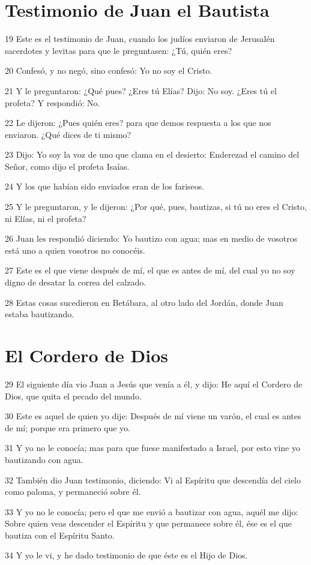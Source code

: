 \section*{Testimonio de Juan el Bautista}

\par 19 Este es el testimonio de Juan, cuando los judíos enviaron de Jerusalén sacerdotes y levitas para que le preguntasen: ¿Tú, quién eres?
\par 20 Confesó, y no negó, sino confesó: Yo no soy el Cristo.
\par 21 Y le preguntaron: ¿Qué pues? ¿Eres tú Elías? Dijo: No soy. ¿Eres tú el profeta? Y respondió: No.
\par 22 Le dijeron: ¿Pues quién eres? para que demos respuesta a los que nos enviaron. ¿Qué dices de ti mismo?
\par 23 Dijo: Yo soy la voz de uno que clama en el desierto: Enderezad el camino del Señor, como dijo el profeta Isaías.
\par 24 Y los que habían sido enviados eran de los fariseos.
\par 25 Y le preguntaron, y le dijeron: ¿Por qué, pues, bautizas, si tú no eres el Cristo, ni Elías, ni el profeta?
\par 26 Juan les respondió diciendo: Yo bautizo con agua; mas en medio de vosotros está uno a quien vosotros no conocéis.
\par 27 Este es el que viene después de mí, el que es antes de mí, del cual yo no soy digno de desatar la correa del calzado.
\par 28 Estas cosas sucedieron en Betábara, al otro lado del Jordán, donde Juan estaba bautizando.

\section*{El Cordero de Dios}

\par 29 El siguiente día vio Juan a Jesús que venía a él, y dijo: He aquí el Cordero de Dios, que quita el pecado del mundo.
\par 30 Este es aquel de quien yo dije: Después de mí viene un varón, el cual es antes de mí; porque era primero que yo.
\par 31 Y yo no le conocía; mas para que fuese manifestado a Israel, por esto vine yo bautizando con agua.
\par 32 También dio Juan testimonio, diciendo: Vi al Espíritu que descendía del cielo como paloma, y permaneció sobre él.
\par 33 Y yo no le conocía; pero el que me envió a bautizar con agua, aquél me dijo: Sobre quien veas descender el Espíritu y que permanece sobre él, ése es el que bautiza con el Espíritu Santo.
\par 34 Y yo le vi, y he dado testimonio de que éste es el Hijo de Dios.

